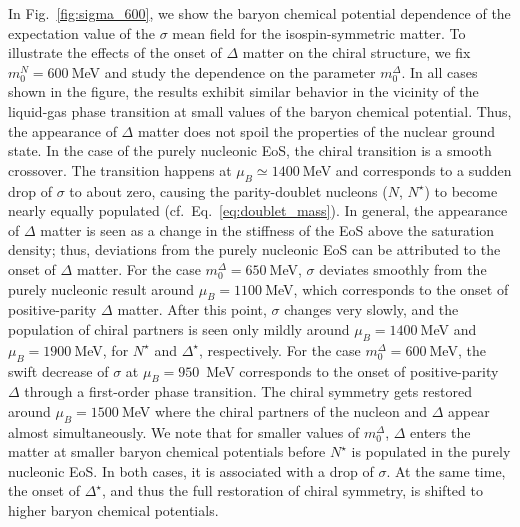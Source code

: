 \documentclass[preprint,showkeys,lengthcheck,nofootinbib,twocolumn,notitlepage,floatfix,superscriptaddress]{revtex4-1}
\begin{document}
In Fig.~\ref{fig:sigma_600}, we show the baryon chemical potential dependence of the expectation value of the $\sigma$ mean field for the isospin-symmetric matter. To illustrate the effects of the onset of $\Delta$ matter on the chiral structure, we fix $m_0^N=600~$MeV and study the dependence on the parameter $m_0^\Delta$. In all cases shown in the figure, the results exhibit similar behavior in the vicinity of the liquid-gas phase transition at small values of the baryon chemical potential. Thus, the appearance of $\Delta$ matter does not spoil the properties of the nuclear ground state. In the case of the purely nucleonic EoS, the chiral transition is a smooth crossover. The transition happens at $\mu_B\simeq 1400~$MeV and corresponds to a sudden drop of $\sigma$ to about zero, causing the parity-doublet nucleons ($N$, $N^\star$) to become nearly equally populated (cf.~Eq.~\eqref{eq:doublet_mass}). In general, the appearance of $\Delta$ matter is seen as a change in the stiffness of the EoS above the saturation density; thus, deviations from the purely nucleonic EoS can be attributed to the onset of $\Delta$ matter. For the case $m_0^\Delta=650~$MeV, $\sigma$ deviates smoothly from the purely nucleonic result around $\mu_B=1100~$MeV, which corresponds to the onset of positive-parity $\Delta$ matter. After this point, $\sigma$ changes very slowly, and the population of chiral partners is seen only mildly around $\mu_B=1400~$MeV and $\mu_B=1900~$MeV, for $N^\star$ and $\Delta^\star$, respectively. For the case $m_0^\Delta=600~$MeV, the swift decrease of $\sigma$ at $\mu_B=950$~MeV corresponds to the onset of positive-parity $\Delta$ through a first-order phase transition. The chiral symmetry gets restored around $\mu_B=1500~$MeV where the chiral partners of the nucleon and $\Delta$ appear almost simultaneously. We note that for smaller values of $m_0^\Delta$, $\Delta$ enters the matter at smaller baryon chemical potentials before $N^\star$ is populated in the purely nucleonic EoS. In both cases, it is associated with a drop of $\sigma$. At the same time, the onset of $\Delta^\star$, and thus the full restoration of chiral symmetry, is shifted to higher baryon chemical potentials.
\end{document}
